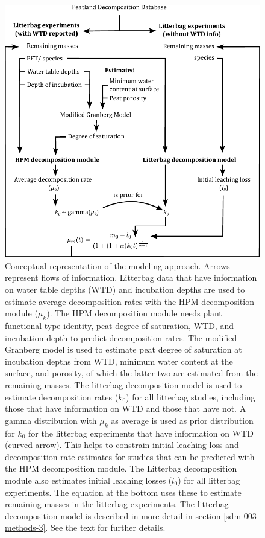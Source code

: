 \documentclass[esd, manuscript]{copernicus}
\begin{document}
\clearpage



\begin{figure}[H]

{\centering \includegraphics[width=0.8\linewidth]{figures/eb1125_hpm_decoposition_conceptual} 

}

\caption{Conceptual representation of the modeling approach. Arrows represent flows of information. Litterbag data that have information on water table depths (WTD) and incubation depths are used to estimate average decomposition rates with the HPM decomposition module (\(\mu_k\)). The HPM decomposition module needs plant functional type identity, peat degree of saturation, WTD, and incubation depth to predict decomposition rates. The modified Granberg model is used to estimate peat degree of saturation at incubation depths from WTD, minimum water content at the surface, and porosity, of which the latter two are estimated from the remaining masses. The litterbag decomposition model is used to estimate decomposition rates (\(k_0\)) for all litterbag studies, including those that have information on WTD and those that have not. A gamma distribution with \(\mu_k\) as average is used as prior distribution for \(k_0\) for the litterbag experiments that have information on WTD (curved arrow). This helps to constrain initial leaching loss and decomposition rate estimates for studies that can be predicted with the HPM decomposition module. The Litterbag decomposition module also estimates initial leaching losses (\(l_0\)) for all litterbag experiments. The equation at the bottom uses these to estimate remaining masses in the litterbag experiments. The litterbag decomposition model is described in more detail in section \ref{sdm-003-methods-3}. See the text for further details.}\label{fig:hpmd-m-conceptual}
\end{figure}
\end{document}
